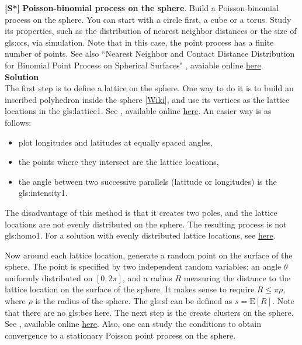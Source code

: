 \documentclass[10pt]{article}
\begin{document}
\begin{Exercise}\label{sphere90}
{\bf [S*]}  {\bf Poisson-binomial process on the sphere}.  Build a Poisson-binomial process on the sphere. You can start with a circle first, a cube or a torus. Study its properties, such as the distribution of \textcolor{index}{nearest neighbor distances} or the size of \glspl{gls:cc}, via simulation. Note that in this case, the point process has a finite number of points. 
See also ``Nearest Neighbor and Contact Distance Distribution for Binomial Point Process on Spherical Surfaces" \cite{sphere}, avaiable 
online \href{https://arxiv.org/abs/2005.07330}{here}. \vspace{1ex} \\
{\bf Solution} \vspace{1ex} \\
The first step is to define a lattice on the sphere. One way to do it is to build an inscribed polyhedron inside the sphere [\href{https://mathworld.wolfram.com/Circumsphere.html}{Wiki}], and use its \textcolor{index}{vertices} as the lattice locations in the \gls{gls:lattice1}. See \cite{physicj}, available online \href{https://iopscience.iop.org/article/10.1088/1742-6596/1581/1/012054}{here}. 
An easier way is as follows:  
\begin{itemize}
\item plot longitudes and latitudes at equally spaced angles,
\item the points where they intersect are the lattice locations, 
\item the angle between two successive parallels (latitude or longitudes) is the \gls{gls:intensity1}. 
\end{itemize}
The disadvantage of this method is that  it creates two poles, and the lattice locations are not evenly distributed on the sphere. The resulting process is not 
 \gls{gls:homo1}. For a solution with evenly distributed lattice locations, see \href{https://www.maths.unsw.edu.au/about/distributing-points-sphere}{here}. 

Now around each lattice location, generate a random point on the surface of the sphere. The point is specified by two independent random variables: an angle $\theta$ uniformly distributed 
on $[0,2\pi]$, and a radius $R$ measuring the distance to the lattice location on the surface of the sphere. It makes sense to require $R\leq \pi\rho$, where $\rho$ is
the radius of the sphere. The \gls{gls:sf} can be defined as $s=\mbox{E}[R]$. Note that there are no \glspl{gls:be} here. The next step  is the create \textcolor{index}{clusters on the sphere}. See \cite{sphere343}, available online \href{https://bit.ly/3utjJOm}{here}. Also, one can  study the conditions to obtain convergence to
a stationary Poisson point process on the sphere.


\end{Exercise}
\end{document}
